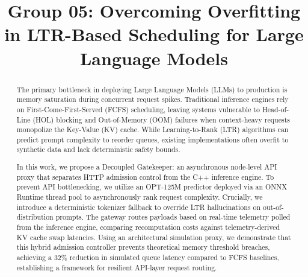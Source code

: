 \documentclass[conference]{IEEEtran}
\begin{document}
\title{Group 05: Overcoming Overfitting in LTR-Based Scheduling for Large Language Models}

\author{
\and
{}
}

\maketitle

\begin{abstract}
The primary bottleneck in deploying Large Language Models (LLMs) to production is memory saturation during concurrent request spikes. Traditional inference engines rely on First-Come-First-Served (FCFS) scheduling, leaving systems vulnerable to Head-of-Line (HOL) blocking and Out-of-Memory (OOM) failures when context-heavy requests monopolize the Key-Value (KV) cache. While Learning-to-Rank (LTR) algorithms can predict prompt complexity to reorder queues, existing implementations often overfit to synthetic data and lack deterministic safety bounds. 

In this work, we propose a Decoupled Gatekeeper: an asynchronous node-level API proxy that separates HTTP admission control from the C++ inference engine. To prevent API bottlenecking, we utilize an OPT-125M predictor deployed via an ONNX Runtime thread pool to asynchronously rank request complexity. Crucially, we introduce a deterministic tokenizer fallback to override LTR hallucinations on out-of-distribution prompts. The gateway routes payloads based on real-time telemetry polled from the inference engine, comparing recomputation costs against telemetry-derived KV cache swap latencies. Using an architectural simulation proxy, we demonstrate that this hybrid admission controller prevents theoretical memory threshold breaches, achieving a 32\% reduction in simulated queue latency compared to FCFS baselines, establishing a framework for resilient API-layer request routing.
\end{abstract}
\end{document}
